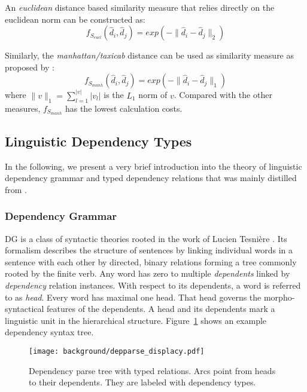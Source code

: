 An \textit{euclidean} distance based similarity measure that relies directly on the euclidean norm can be constructed as:
\begin{equation}
f_{S_{eucl}}(\hat{d}_i, \hat{d}_j) = exp(-\lVert\hat{d}_i - \hat{d}_j\rVert_2)
\end{equation}


Similarly, the \textit{manhattan/taxicab} distance can be used as similarity measure as proposed by \textcite{mueller_siamese_2016}:
\begin{equation}
f_{S_{manh}}(\hat{d}_i, \hat{d}_j) = exp(-\lVert\hat{d}_i - \hat{d}_j\rVert_1)
\end{equation}
where $\lVert v\rVert_1 = \sum\limits_{l=1}^{|v|}|v_l|$ is the $L_1$ norm of $v$. Compared with the other measures, $f_{S_{manh}}$ has the lowest calculation costs. %

\subsection{Linguistic Dependency Types}
In the following, we present a very brief introduction into the theory of linguistic dependency grammar and typed dependency relations that was mainly distilled from \textcite{jurafsky_dependency_2014}.

\subsubsection{Dependency Grammar}
\ac{DG} is a class of syntactic theories rooted in the work of Lucien Tesni\`{e}re \autocite{tesniere_elements_1976}. Its formalism describes the structure of sentences by linking individual words in a sentence with each other by directed, binary relations forming a tree commonly rooted by the finite verb. Any word has zero to multiple \textit{dependents} linked by \textit{dependency} relation instances. With respect to its dependents, a word is referred to as \textit{head}. Every word has maximal one head. That head governs the morpho-syntactical features of the dependents. A head and its dependents mark a linguistic unit in the hierarchical structure. Figure~\ref{fig:displacy_deps} shows an example dependency syntax tree.

\begin{figure}[htb!]
  \centering
  \texttt{[image: background/depparse\_displacy.pdf]}
  \caption{Dependency parse tree with typed relations. Arcs point from heads to their dependents. They are labeled with dependency types.}
  \label{fig:displacy_deps}
 \end{figure}


